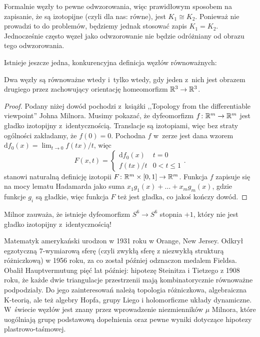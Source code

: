Formalnie węzły to pewne odwzorowania, więc prawidłowym sposobem na zapisanie, że są izotopijne (czyli dla nas: równe), jest $K_1 \cong K_2$.
Ponieważ nie prowadzi to do problemów, będziemy jednak stosować zapis $K_1 = K_2$.
Jednocześnie często węzeł jako odwzorowanie nie będzie odróżniany od obrazu tego odwzorowania.

Istnieje jeszcze jedna, konkurencyjna definicja węzłów równoważnych:

\begin{proposition}
\label{def:equivalent_knots_2}%
    Dwa węzły są równoważne wtedy i~tylko wtedy, gdy jeden z~nich jest obrazem drugiego przez zachowujący orientację homeomorfizm $\mathbb R^3 \to \mathbb R^3$.
\end{proposition}

\begin{proof}
    Podany niżej dowód pochodzi z~książki ,,Topology from the differentiable viewpoint'' Johna Milnora.
%
    Musimy pokazać, że dyfeomorfizm $f \colon \mathbb R^m \to \mathbb R^m$ jest gładko izotopijny z~identycznością.
    Translacje są izotopiami, więc bez straty ogólności zakładamy, że $f(0) = 0$.
    Pochodna $f$ w~zerze jest dana wzorem $\mathrm{d}f_0(x) = \lim_{t \to 0} f(tx) /t$, więc
    \begin{equation}
        F(x, t) = \begin{cases}
            \mathrm{d}f_0(x) & t = 0 \\
            f(tx) / t & 0 < t \le 1
        \end{cases} .
    \end{equation}
    stanowi naturalną definicję izotopii $F \colon \mathbb R^m \times [0, 1] \to \mathbb R^m$.
    Funkcja $f$ zapisuje się na mocy lematu Hadamarda jako suma $x_1 g_1(x) + \ldots + x_mg_m(x)$, gdzie funkcje $g_i$ są gładkie, więc funkcja $F$ też jest gładka, co jakoś kończy dowód.
%    
\end{proof}

Milnor zauważa, że istnieje dyfeomorfizm $S^6 \to S^6$ stopnia $+1$, który nie jest gładko izotopijny z~identycznością!
%

\begin{remark}
    Matematyk amerykański urodzon w 1931 roku w Orange, New Jersey.
    Odkrył egzotyczną 7-wymiarową sferę (czyli zwykłą sferę z niezwykłą strukturą różniczkową) w 1956 roku, za co został później odznaczon medalem Fieldsa.
    Obalił Hauptvermutung pięć lat później: hipotezę Steinitza i Tietzego z 1908 roku, że każde dwie triangulacje przestrzenii mają kombinatorycznie równoważne podpodziały.
    Do jego zainteresowań należą topologia różniczkowa, algebraiczna K-teorią, ale też algebry Hopfa, grupy Liego i holomorficzne układy dynamiczne.
    W~świecie węzłów jest znany przez wprowadzenie niezmienników $\mu$ Milnora, które uogólniają grupę podstawową dopełnienia oraz pewne wyniki dotyczące hipotezy plastrowo-taśmowej.
\end{remark}
%
%
%

